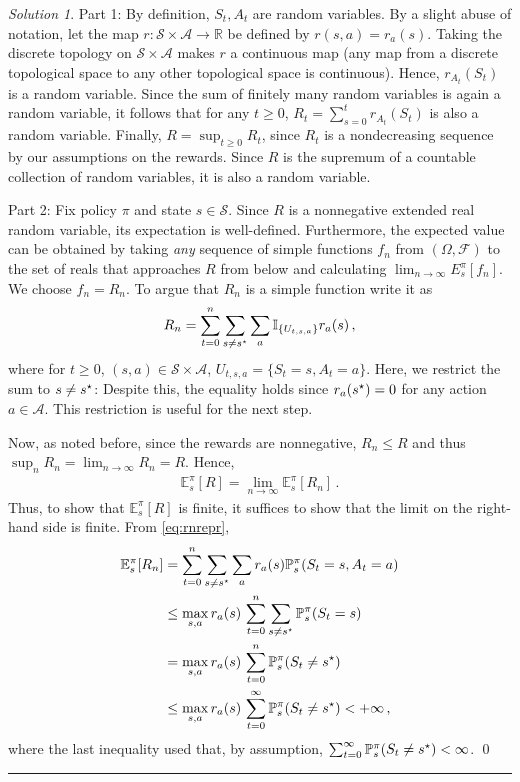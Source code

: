 \documentclass{article}
\newcommand{\R}{\mathbb{R}}
\DeclareMathOperator*{\1}{\mathbbm{1}}
\newcommand{\E}{\mathbb E}
\newcommand{\cF}{\mathcal{F}}
\theoremstyle{definition}
\theoremstyle{remark}
\newtheorem*{solution*}{Solution}
\newcommand{\cS}{\mathcal{S}}
\newcommand{\cA}{\mathcal{A}}
\begin{document}
\begin{solution*}
Part 1:
By definition, $S_t,A_t$ are random variables.
By a slight abuse of notation, let the map $r: \cS \times \cA \to \R$ be defined by $r(s,a) = r_a(s)$.
Taking the discrete topology on $\cS \times \cA$ makes $r$ a continuous map (any map from a discrete topological space to any other topological space is continuous).
Hence, $r_{A_t}(S_t)$ is a random variable. Since the sum of finitely many random variables is again a random variable, it follows that for any
$t\ge 0$, $R_t = \sum_{s=0}^t r_{A_t}(S_t)$ is also a random variable.
Finally, $R = \sup_{t\ge 0} R_t$, since $R_t$ is a nondecreasing sequence by our assumptions on the rewards. Since $R$ is the supremum of a countable collection of random variables, it is also a random variable.

Part 2:
Fix policy $\pi$ and state $s\in \cS$. 
Since $R$ is a nonnegative extended real random variable, its expectation is well-defined.
Furthermore, the expected value can be obtained by taking \emph{any} sequence of simple functions $f_n$ from $(\Omega,\cF)$ to the set of reals that approaches $R$ from below
and calculating $\lim_{n\to\infty} E_s^\pi[f_n]$.
We choose $f_n = R_n$. 
To argue that $R_n$ is a simple function write it as 
\begin{align}
R_n = \sum_{t=0}^n \sum_{s\ne s^{\star}} \sum_a \mathbb{I}_{\{U_{t,s,a}\}} r_a(s)\,,
\label{eq:rnrepr}
\end{align}
where for $t\ge 0$, $(s,a)\in \cS\times \cA$, $U_{t,s,a} = \{ S_t=s, A_t = a\}$.
Here, we restrict the sum to $s\ne s^{\star}$: Despite this, the equality holds 
since $r_a(s^{\star})=0$ for any action $a\in \cA$. This restriction is useful for the next step.

Now, as noted before, 
since the rewards are nonnegative, $R_n \le R$ and thus $\sup_{n} R_n = \lim_{n\to\infty} R_n = R$.
Hence, 
\begin{align*}
\E_s^{\pi}[R]= \lim_{n\to\infty} \E_s^{\pi}[R_n]\,.
\end{align*}
Thus, to show that $\E_s^{\pi}[R]$ is finite, it suffices to show that the limit on the right-hand side is finite.
From \eqref{eq:rnrepr},
\begin{align*}
\E_s^\pi[R_n] 
& = \sum_{t=0}^n \sum_{s\ne \term} \sum_a r_a(s) \PP_s^\pi( S_t=s, A_t = a )\\
&\le \max_{s,a} r_a(s) \,  \sum_{t=0}^n \sum_{s\ne \term}  \PP_s^\pi( S_t=s ) \\
&= \max_{s,a} r_a(s) \,  \sum_{t=0}^n \PP_s^\pi( S_t\ne \term ) \\
&\le \max_{s,a} r_a(s) \,  \sum_{t=0}^\infty \PP_s^\pi( S_t\ne \term ) < +\infty\,,
\end{align*}
where the last inequality used that, by assumption, 
$\sum_{t=0}^\infty \mathbb{P}_s^\pi( S_t\ne s^{\star} ) <\infty$.
\qed\par\smallskip\hrule
\end{solution*}
\end{document}
